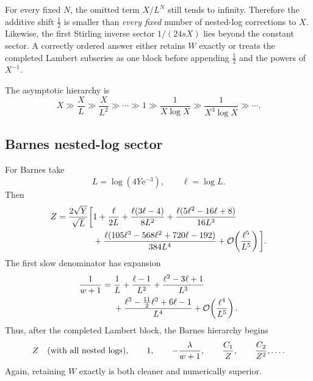 \documentclass[11pt,a4paper]{article}
\numberwithin{equation}{section}
\theoremstyle{definition}
\theoremstyle{remark}
\newcommand{\e}{\mathrm e}
\newcommand{\Ord}{\mathcal O}
\begin{document}
\begin{cautionbox}[title={Sector ordering matters}]
For every fixed \(N\), the omitted term \(X/L^N\) still tends to infinity.
Therefore the additive shift \(\tfrac12\) is smaller than \emph{every fixed}
number of nested-log corrections to \(X\).  Likewise, the first Stirling
inverse sector \(1/(24sX)\) lies beyond the constant sector.  A correctly
ordered answer either retains \(W\) exactly or treats the completed
Lambert subseries as one block before appending \(\tfrac12\) and the
powers of \(X^{-1}\).
\end{cautionbox}

The asymptotic hierarchy is
\begin{equation}
 X\gg \frac{X}{L}\gg\frac{X}{L^2}\gg\cdots
 \gg1\gg\frac1{X\log X}\gg\frac1{X^3\log X}\gg\cdots.
 \label{eq:gamma-hierarchy}
\end{equation}

\subsection{Barnes nested-log sector}

For Barnes take
\begin{equation}
 L=\log(4Y\e^{-3}),\qquad \ell=\log L.
 \label{eq:barnes-Lell}
\end{equation}
Then
\begin{align}
 Z=\frac{2\sqrt Y}{\sqrt L}\bigg[{}&1+\frac{\ell}{2L}
 +\frac{\ell(3\ell-4)}{8L^2}
 +\frac{\ell(5\ell^2-16\ell+8)}{16L^3}
 \notag\\
 &+\frac{\ell(105\ell^3-568\ell^2+720\ell-192)}{384L^4}
 +\Ord\!\left(\frac{\ell^5}{L^5}\right)\bigg].
 \label{eq:barnes-Z-nested}
\end{align}
The first slow denominator has expansion
\begin{align}
 \frac1{w+1}={}&\frac1L+\frac{\ell-1}{L^2}
 +\frac{\ell^2-3\ell+1}{L^3}
 \notag\\
 &+\frac{\ell^3-\tfrac{11}{2}\ell^2+6\ell-1}{L^4}
 +\Ord\!\left(\frac{\ell^4}{L^5}\right).
 \label{eq:inv-D-nested}
\end{align}
Thus, after the completed Lambert block, the Barnes hierarchy begins
\begin{equation}
 Z\quad\hbox{(with all nested logs)},\qquad
 1,\qquad -\frac{\lambda}{w+1},\qquad
 \frac{C_1}{Z},\qquad\frac{C_2}{Z^2},\ldots.
 \label{eq:barnes-hierarchy}
\end{equation}
Again, retaining \(W\) exactly is both cleaner and numerically superior.
\end{document}
